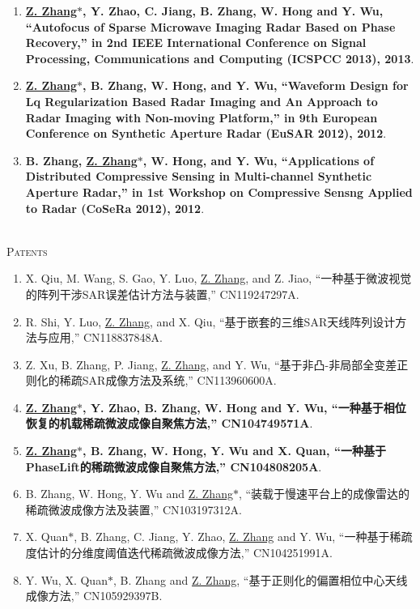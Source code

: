 \documentclass[paper=a4,fontsize=11pt]{scrartcl}
\begin{document}
\begin{enumerate}
\item \textbf{\underline{Z. Zhang$\ast$}, Y. Zhao, C. Jiang, B. Zhang, W. Hong and Y. Wu, ``Autofocus of Sparse Microwave Imaging Radar Based on Phase Recovery,'' in 2nd IEEE International Conference on Signal Processing, Communications and Computing (ICSPCC 2013), 2013}.

\item \textbf{\underline{Z. Zhang$\ast$}, B. Zhang, W. Hong, and Y. Wu, ``Waveform Design for Lq Regularization Based Radar Imaging and An Approach to Radar Imaging with Non-moving Platform,'' in 9th European Conference on Synthetic Aperture Radar (EuSAR 2012), 2012}.

\item \textbf{B. Zhang, \underline{Z. Zhang$\ast$}, W. Hong, and Y. Wu, ``Applications of Distributed Compressive Sensing in Multi-channel Synthetic Aperture Radar,'' in 1st Workshop on Compressive Sensng Applied to Radar (CoSeRa 2012), 2012}.

\end{enumerate}

~\\
\textsc{Patents}

\begin{enumerate}

\item  X. Qiu, M. Wang, S. Gao, Y. Luo, \underline{Z. Zhang}, and Z. Jiao, ``一种基于微波视觉的阵列干涉SAR误差估计方法与装置,'' CN119247297A.

\item  R. Shi, Y. Luo, \underline{Z. Zhang}, and X. Qiu, ``基于嵌套的三维SAR天线阵列设计方法与应用,'' CN118837848A.

\item Z. Xu, B. Zhang, P. Jiang, \underline{Z. Zhang}, and Y. Wu, ``基于非凸-非局部全变差正则化的稀疏SAR成像方法及系统,'' CN113960600A.

\item \textbf{\underline{Z. Zhang$\ast$}, Y. Zhao, B. Zhang, W. Hong and Y. Wu, ``一种基于相位恢复的机载稀疏微波成像自聚焦方法,'' CN104749571A}.

\item \textbf{\underline{Z. Zhang$\ast$}, B. Zhang, W. Hong, Y. Wu and X. Quan, ``一种基于PhaseLift的稀疏微波成像自聚焦方法,'' CN104808205A}.

\item B. Zhang, W. Hong, Y. Wu and \underline{Z. Zhang$\ast$}, ``装载于慢速平台上的成像雷达的稀疏微波成像方法及装置,'' CN103197312A.

\item X. Quan$\ast$, B. Zhang, C. Jiang, Y. Zhao, \underline{Z. Zhang} and Y. Wu, ``一种基于稀疏度估计的分维度阈值迭代稀疏微波成像方法,'' CN104251991A.

\item Y. Wu, X. Quan$\ast$, B. Zhang and \underline{Z. Zhang}, ``基于正则化的偏置相位中心天线成像方法,'' CN105929397B.

\end{enumerate}
\end{document}
